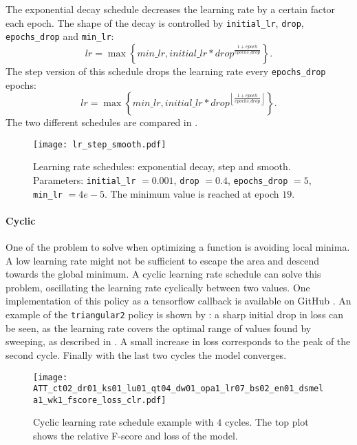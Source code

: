 The exponential decay schedule decreases the learning rate by a certain factor
each epoch. The shape of the decay is controlled by \texttt{initial\_lr},
\texttt{drop}, \texttt{epochs\_drop} and \texttt{min\_lr}:
\begin{equation}
    lr =
    \max \left\{ 
        min\_lr,
        initial\_lr * drop ^{ \frac{1 + epoch}{epochs\_drop} }
    \right\}
    .
    \label{eq:lr_smooth}
\end{equation}
The step version of this schedule drops the learning rate every
\texttt{epochs\_drop} epochs:
\begin{equation}
    lr =
    \max \left\{ 
        min\_lr,
        initial\_lr * drop ^{
            \left\lfloor 
                \frac{1 + epoch}{epochs\_drop}
            \right\rfloor
        }
    \right\}
    .
    \label{eq:lr_step}
\end{equation}
The two different schedules are compared in .
\begin{figure}[t!]
    \centering
    \texttt{[image: lr\_step\_smooth.pdf]}
    \caption{Learning rate schedules: exponential decay, step and smooth.
        Parameters:
        \texttt{initial\_lr} $=0.001$,
        \texttt{drop} $=0.4$,
        \texttt{epochs\_drop} $=5$,
        \texttt{min\_lr} $=4e-5$.
        The minimum value is reached at epoch $19$.}%
    \label{fig:lr_step_smooth}
\end{figure}

\paragraph{Cyclic}

One of the problem to solve when optimizing a function is avoiding local minima.
A low learning rate might not be sufficient to escape the area and descend
towards the global minimum.
A cyclic learning rate schedule \cite{smith2017cyclical} can solve this problem,
oscillating the learning rate cyclically between two values.
One implementation of this policy as a tensorflow callback is available on
GitHub \cite{bckenstlerCLR}.
An example of the \texttt{triangular2} policy is shown by
: a sharp initial drop in loss can be seen, as the
learning rate covers the optimal range of values found by sweeping, as
described in . A small increase in loss corresponds to the
peak of the second cycle. Finally with the last two cycles the model converges.

\begin{figure}[t!]
    \centering
    \texttt{[image: ATT\_ct02\_dr01\_ks01\_lu01\_qt04\_dw01\_opa1\_lr07\_bs02\_en01\_dsmela1\_wk1\_fscore\_loss\_clr.pdf]}
    \caption{Cyclic learning rate schedule example with $4$ cycles.
    The top plot shows the relative F-score and loss of the model.}%
    \label{fig:cyclic_lr_example}
\end{figure}

